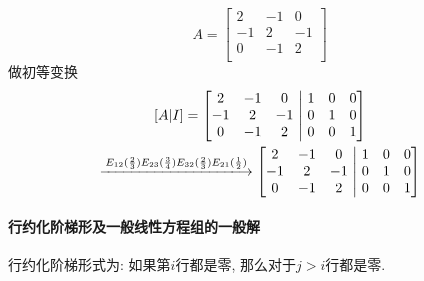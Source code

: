 \begin{example}
    \begin{equation}
      A = \begin{bmatrix}
       2 & -1 & 0\\
       -1 & 2 & -1\\
       0 & -1 & 2\\
      \end{bmatrix}
    \end{equation}
    做初等变换
    \begin{equation}
      \begin{gathered}
        \relax [ A | I ] = \left[ \begin{matrix}
            2 & -1 & 0\\
            -1 & 2 & -1\\
            0 & -1 & 2\\
           \end{matrix}
           \ 
           \middle|
           \ 
           \begin{matrix}
            1 & 0 & 0\\
            0 & 1 & 0\\
            0 & 0 & 1\\
           \end{matrix}
           \right] 
           \\
           \xlongrightarrow{E_{12}(\frac{2}{3})E_{23}(\frac{3}{4})E_{32}(\frac{2}{3})E_{21}(\frac{1}{2})}
           \left[ \begin{matrix}
            2 & -1 & 0\\
            -1 & 2 & -1\\
            0 & -1 & 2\\
           \end{matrix}
           \ 
           \middle|
           \ 
           \begin{matrix}
            1 & 0 & 0\\
            0 & 1 & 0\\
            0 & 0 & 1\\
           \end{matrix}
           \right] 
      \end{gathered}
    \end{equation}
\end{example}

\paragraph{行约化阶梯形及一般线性方程组的一般解}
行约化阶梯形式为: 
如果第$i$行都是零, 那么对于$j>i$行都是零.

